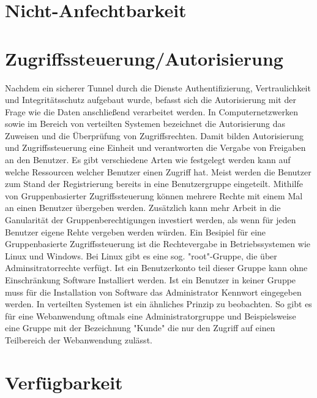 \section{Nicht-Anfechtbarkeit}
\section{Zugriffssteuerung/Autorisierung}

Nachdem ein sicherer Tunnel durch die Dienste Authentifizierung, Vertraulichkeit und 
Integritätsschutz aufgebaut wurde, befasst sich die Autorisierung mit der Frage wie die Daten 
anschließend verarbeitet werden. 
In Computernetzwerken sowie im Bereich von verteilten Systemen bezeichnet die Autorisierung das Zuweisen 
und die Überprüfung von Zugriffsrechten. Damit bilden Autorisierung und Zugriffssteuerung eine Einheit und 
verantworten die Vergabe von Freigaben an den Benutzer. 
Es gibt verschiedene Arten wie festgelegt werden kann auf welche Ressourcen welcher Benutzer einen Zugriff hat. 
Meist werden die Benutzer zum Stand der Registrierung bereits in eine Benutzergruppe eingeteilt. 
Mithilfe von Gruppenbasierter Zugriffssteuerung können mehrere Rechte mit einem Mal an einen Benutzer übergeben werden. 
Zusätzlich kann mehr Arbeit in die Ganularität der Gruppenberechtigungen investiert werden, als 
wenn für jeden Benutzer eigene Rehte vergeben werden würden. 
Ein Besipiel für eine Gruppenbasierte Zugriffssteuerung ist die Rechtevergabe in Betriebssystemen wie Linux und Windows.
Bei Linux gibt es eine sog. "root"-Gruppe, die über Adminsitratorrechte verfügt. Ist ein Benutzerkonto teil dieser Gruppe
kann ohne Einschränkung Software Installiert werden. Ist ein Benutzer in keiner Gruppe muss für die Installation von Software 
das Administrator Kennwort eingegeben werden. 
In verteilten Systemen ist ein ähnliches Prinzip zu beobachten. So gibt es für eine Webanwendung oftmals 
eine Administratorgruppe und Beispielsweise eine Gruppe mit der Bezeichnung "Kunde" die nur den Zugriff auf 
einen Teilbereich der Webanwendung zulässt. 

\section{Verfügbarkeit}